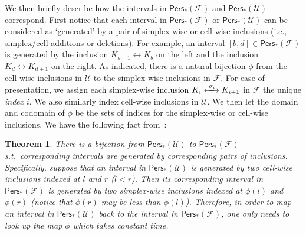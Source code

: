 \documentclass[letterpaper,11pt]{article}
\theoremstyle{mythmstyle}
\newtheorem{theorem}{Theorem}
\theoremstyle{mydefstyle}
\theoremstyle{plain}
\newtheorem{theorem}{Theorem}
\theoremstyle{definition}
\newcommand{\Pers}{\mathsf{Pers}}
\newcommand{\<}[1]{\langle #1\rangle}
\newcommand{\lbarrowspace}{\;}
\newcommand{\lrarrowsp}[1]{\xleftrightarrow{\lbarrowspace#1\lbarrowspace}}
\let\leftrightarrowsp\lrarrowsp
\newcommand{\Fcal}{\mathcal{F}}
\newcommand{\Ucal}{\mathcal{U}}
\newcommand{\fsimp}[2]{\sigma_{#2}}
\newcommand{\Ud}{{\mathcal U}}
\begin{document}
We then briefly describe how the intervals in $\Pers_*(\Fcal)$
and $\Pers_*(\Ucal)$ correspond.
First notice that each interval in $\Pers_*(\Fcal)$
or $\Pers_*(\Ucal)$ can be considered as `generated' by a pair
of simplex-wise or cell-wise inclusions
(i.e., simplex/cell additions or deletions).
For example, an interval $[b,d]\in\Pers_*(\Fcal)$ is generated
by 
the  inclusion $K_{b-1}\leftrightarrow K_{b}$ on the left and 
the  inclusion $K_{d}\leftrightarrow K_{d+1}$ on the right.
As indicated,
there is a natural bijection $\phi$
from the cell-wise inclusions in $\Ud$ to the simplex-wise inclusions in $\Fcal$.
For ease of presentation,
we assign each simplex-wise inclusion
$K_i\leftrightarrowsp{\fsimp{}{i}}K_{i+1}$ in $\Fcal$
the unique  \emph{index} $i$.
We also similarly index cell-wise inclusions in $\Ucal$.
We then let
the domain and codomain of $\phi$
be the sets of {indices} for the simplex-wise or cell-wise
inclusions.
We  have the following fact from~\cite{dey2022fast}:
\begin{theorem}\label{thm:fzz-intv-map}
There is a bijection from  $\Pers_*(\Ucal)$ to $\Pers_*(\Fcal)$
s.t.\ corresponding intervals 
are generated by corresponding pairs of inclusions.
Specifically, suppose that an interval in $\Pers_*(\Ucal)$
is generated by two cell-wise inclusions indexed at $l$
and $r$  ($l< r$).
Then its corresponding interval in $\Pers_*(\Fcal)$
is generated by  two
simplex-wise inclusions indexed at $\phi(l)$
and $\phi(r)$
(notice that  $\phi(r)$ may be less than $\phi(l)$).
Therefore,
in order to map an interval in $\Pers_*(\Ucal)$
back to the interval in $\Pers_*(\Fcal)$,
one only needs to look up the map $\phi$ which takes constant time.
\end{theorem}
\end{document}
